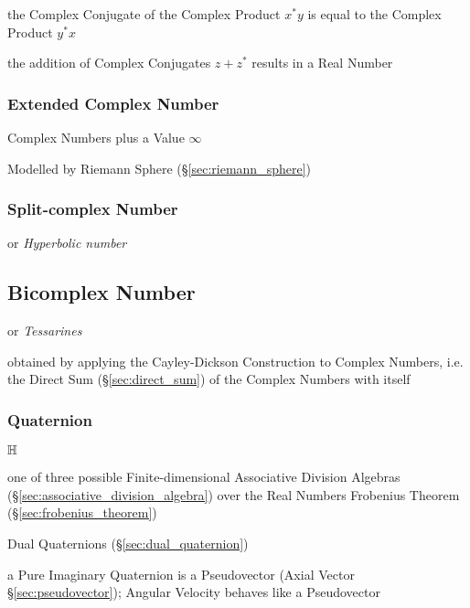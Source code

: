 the Complex Conjugate of the Complex Product $x^*y$ is equal to the Complex
Product $y^*x$

the addition of Complex Conjugates $z + z^*$ results in a Real Number



\subsubsection{Extended Complex Number}\label{sec:extended_complex}

Complex Numbers plus a Value $\infty$

Modelled by Riemann Sphere (\S\ref{sec:riemann_sphere})



\subsubsection{Split-complex Number}\label{sec:split_complex}

or \emph{Hyperbolic number}



\subsection{Bicomplex Number}\label{sec:bicomplex_number}

or \emph{Tessarines}

obtained by applying the Cayley-Dickson Construction to Complex Numbers, i.e.
the Direct Sum (\S\ref{sec:direct_sum}) of the Complex Numbers with itself



\subsubsection{Quaternion}\label{sec:quaternion}

$\mathbb{H}$

one of three possible Finite-dimensional Associative Division Algebras
(\S\ref{sec:associative_division_algebra}) over the Real Numbers \fist
Frobenius Theorem (\S\ref{sec:frobenius_theorem})

\fist Dual Quaternions (\S\ref{sec:dual_quaternion})

a Pure Imaginary Quaternion is a Pseudovector (Axial Vector
\S\ref{sec:pseudovector}); Angular Velocity behaves like a Pseudovector

